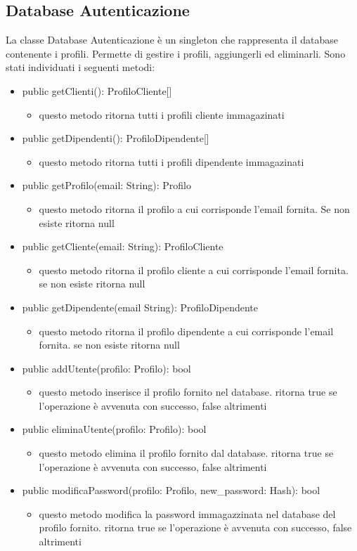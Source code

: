 \documentclass{report}
\begin{document}
\subsection*{Database Autenticazione}
La classe Database Autenticazione è un singleton che rappresenta il database contenente i profili. 
Permette di gestire i profili, aggiungerli ed eliminarli.
Sono stati individuati i seguenti metodi: 
\begin{itemize}
	\item public getClienti(): ProfiloCliente[]
	\begin{itemize}
		\item questo metodo ritorna tutti i profili cliente immagazinati
	\end{itemize}
	\item public getDipendenti(): ProfiloDipendente[]
	\begin{itemize}
		\item questo metodo ritorna tutti i profili dipendente immagazinati
	\end{itemize}
	\item public getProfilo(email: String): Profilo
	\begin{itemize}
		\item questo metodo ritorna il profilo a cui corrisponde l'email fornita. Se non esiste ritorna null
	\end{itemize}
	\item public getCliente(email: String): ProfiloCliente
	\begin{itemize}
		\item questo metodo ritorna il profilo cliente a cui corrisponde l'email fornita. se non esiste ritorna null
	\end{itemize}
	\item public getDipendente(email String): ProfiloDipendente
	\begin{itemize}
		\item questo metodo ritorna il profilo dipendente a cui corrisponde l'email fornita. se non esiste ritorna null
	\end{itemize}
	\item public addUtente(profilo: Profilo): bool
	\begin{itemize}
		\item questo metodo inserisce il profilo fornito nel database. ritorna true se l'operazione è avvenuta con successo, false altrimenti
	\end{itemize}
	\item public eliminaUtente(profilo: Profilo): bool
	\begin{itemize}
		\item questo metodo elimina il profilo fornito dal database. ritorna true se l'operazione è avvenuta con successo, false altrimenti
	\end{itemize}
	\item public modificaPassword(profilo: Profilo, new\_password: Hash): bool
	\begin{itemize}
		\item questo metodo modifica la password immagazzinata nel database del profilo fornito. ritorna true se l'operazione è avvenuta con successo, false altrimenti
	\end{itemize}
\end{itemize}
\end{document}

